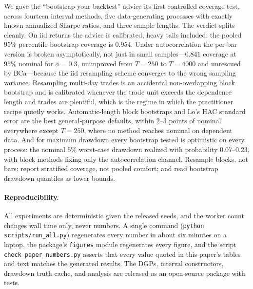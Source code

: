 \documentclass[11pt]{article}
\begin{document}
We gave the ``bootstrap your backtest'' advice its first controlled coverage
test, across fourteen interval methods, five data-generating processes with
exactly known annualized Sharpe ratios, and three sample lengths. The verdict
splits cleanly. On iid returns the advice is calibrated, heavy tails included:
the pooled $95\%$ percentile-bootstrap coverage is $0.954$. Under
autocorrelation the per-bar version is broken asymptotically, not just in
small samples---$0.841$ coverage at $95\%$ nominal for $\phi=0.3$, unimproved
from $T=250$ to $T=4000$ and unrescued by BCa---because the iid resampling
scheme converges to the wrong sampling variance. Resampling multi-day trades
is an accidental non-overlapping block bootstrap and is calibrated whenever
the trade unit exceeds the dependence length and trades are plentiful, which
is the regime in which the practitioner recipe quietly works. Automatic-length
block bootstraps and Lo's HAC standard error are the best general-purpose
defaults, within $2$--$3$ points of nominal everywhere except $T=250$, where
no method reaches nominal on dependent data. And for maximum drawdown every
bootstrap tested is optimistic on every process: the nominal $5\%$ worst-case
drawdown realized with probability $0.07$--$0.23$, with block methods fixing
only the autocorrelation channel. Resample blocks, not bars; report stratified
coverage, not pooled comfort; and read bootstrap drawdown quantiles as lower
bounds.

\paragraph{Reproducibility.} All experiments are deterministic given the
released seeds, and the worker count changes wall time only, never numbers. A
single command (\texttt{python scripts/run\_all.py}) regenerates every number
in about six minutes on a laptop, the package's \texttt{figures} module
regenerates every figure, and the script \texttt{check\_paper\_numbers.py}
asserts that every value quoted in this paper's tables and text matches the
generated results. The DGPs, interval
constructors, drawdown truth cache, and analysis are released as an
open-source package with tests.

\small


\end{document}
